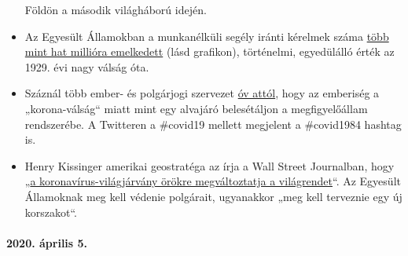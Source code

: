 \begin{itemize}
  Földön a második világháború idején.
\item
  Az Egyesült Államokban a munkanélküli segély iránti kérelmek száma
  \href{https://www.reuters.com/article/us-health-coronavirus-usa-layoffs/us-weekly-jobless-claims-seen-at-record-high-again-idUSKBN21K0FX}{több
  mint hat millióra emelkedett} (lásd grafikon), történelmi, egyedülálló
  érték az 1929. évi nagy válság óta.
\item
  Száznál több ember- és polgárjogi szervezet
  \href{https://www.dailymail.co.uk/news/article-8181381/World-sleepwalking-surveillance-state-rights-groups-warn.html}{óv
  attól}, hogy az emberiség a „korona-válság`` miatt mint egy alvajáró
  belesétáljon a megfigyelőállam rendszerébe. A Twitteren a \#covid19
  mellett megjelent a \#covid1984 hashtag is.
\item
  Henry Kissinger amerikai geostratéga az írja a Wall Street Journalban,
  hogy
  „\href{https://www.wsj.com/articles/the-coronavirus-pandemic-will-forever-alter-the-world-order-11585953005}{a
  koronavírus-világjárvány örökre megváltoztatja a világrendet}``. Az
  Egyesült Államoknak meg kell védenie polgárait, ugyanakkor „meg kell
  terveznie egy új korszakot``.
\end{itemize}

\hypertarget{2020-uxe1prilis-5}{%
\paragraph{2020. április 5.}\label{2020-uxe1prilis-5}}

